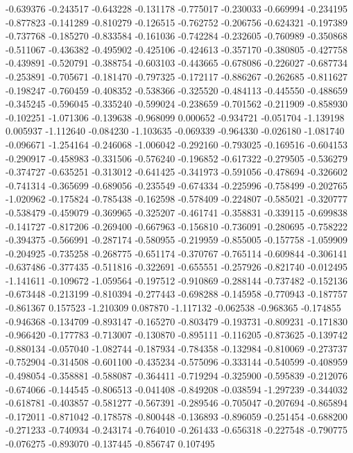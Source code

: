 -0.639376
-0.243517
-0.643228
-0.131178
-0.775017
-0.230033
-0.669994
-0.234195
-0.877823
-0.141289
-0.810279
-0.126515
-0.762752
-0.206756
-0.624321
-0.197389
-0.737768
-0.185270
-0.833584
-0.161036
-0.742284
-0.232605
-0.760989
-0.350868
-0.511067
-0.436382
-0.495902
-0.425106
-0.424613
-0.357170
-0.380805
-0.427758
-0.439891
-0.520791
-0.388754
-0.603103
-0.443665
-0.678086
-0.226027
-0.687734
-0.253891
-0.705671
-0.181470
-0.797325
-0.172117
-0.886267
-0.262685
-0.811627
-0.198247
-0.760459
-0.408352
-0.538366
-0.325520
-0.484113
-0.445550
-0.488659
-0.345245
-0.596045
-0.335240
-0.599024
-0.238659
-0.701562
-0.211909
-0.858930
-0.102251
-1.071306
-0.139638
-0.968099
0.000652
-0.934721
-0.051704
-1.139198
0.005937
-1.112640
-0.084230
-1.103635
-0.069339
-0.964330
-0.026180
-1.081740
-0.096671
-1.254164
-0.246068
-1.006042
-0.292160
-0.793025
-0.169516
-0.604153
-0.290917
-0.458983
-0.331506
-0.576240
-0.196852
-0.617322
-0.279505
-0.536279
-0.374727
-0.635251
-0.313012
-0.641425
-0.341973
-0.591056
-0.478694
-0.326602
-0.741314
-0.365699
-0.689056
-0.235549
-0.674334
-0.225996
-0.758499
-0.202765
-1.020962
-0.175824
-0.785438
-0.162598
-0.578409
-0.224807
-0.585021
-0.320777
-0.538479
-0.459079
-0.369965
-0.325207
-0.461741
-0.358831
-0.339115
-0.699838
-0.141727
-0.817206
-0.269400
-0.667963
-0.156810
-0.736091
-0.280695
-0.758222
-0.394375
-0.566991
-0.287174
-0.580955
-0.219959
-0.855005
-0.157758
-1.059909
-0.204925
-0.735258
-0.268775
-0.651174
-0.370767
-0.765114
-0.609844
-0.306141
-0.637486
-0.377435
-0.511816
-0.322691
-0.655551
-0.257926
-0.821740
-0.012495
-1.141611
-0.109672
-1.059564
-0.197512
-0.910869
-0.288144
-0.737482
-0.152136
-0.673448
-0.213199
-0.810394
-0.277443
-0.698288
-0.145958
-0.770943
-0.187757
-0.861367
0.157523
-1.210309
0.087870
-1.117132
-0.062538
-0.968365
-0.174855
-0.946368
-0.134709
-0.893147
-0.165270
-0.803479
-0.193731
-0.809231
-0.171830
-0.966420
-0.177783
-0.713007
-0.130870
-0.895111
-0.116205
-0.873625
-0.139742
-0.880134
-0.057040
-1.082744
-0.187934
-0.784358
-0.132984
-0.810069
-0.273737
-0.752904
-0.314508
-0.601100
-0.435234
-0.575096
-0.333144
-0.540599
-0.408959
-0.498054
-0.358881
-0.588087
-0.364411
-0.719294
-0.325900
-0.595839
-0.212076
-0.674066
-0.144545
-0.806513
-0.041408
-0.849208
-0.038594
-1.297239
-0.344032
-0.618781
-0.403857
-0.581277
-0.567391
-0.289546
-0.705047
-0.207694
-0.865894
-0.172011
-0.871042
-0.178578
-0.800448
-0.136893
-0.896059
-0.251454
-0.688200
-0.271233
-0.740934
-0.243174
-0.764010
-0.261433
-0.656318
-0.227548
-0.790775
-0.076275
-0.893070
-0.137445
-0.856747
0.107495
